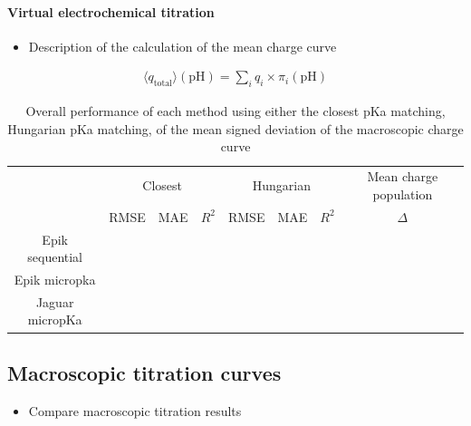 \documentclass[9pt,lineno]{elife}
\newcommand{\pH}{\mathrm{pH}}
\begin{document}
\paragraph{Virtual electrochemical titration}


\begin{itemize}
    \item Description of the calculation of the mean charge curve \\
\end{itemize}

\begin{eqnarray}
      \langle q_\text{total} \rangle (\pH) = \sum_i q_i \times \pi_i(\pH) 
\end{eqnarray}

\begin{table}[H]
\centering
\caption{Overall performance of each method using either the closest pKa matching, Hungarian pKa matching, of the mean signed deviation of the macroscopic charge curve}
\label{tab:overview-performance}
\begin{tabular}{c|ccc|ccc|c}
                & \multicolumn{3}{c|}{Closest} & \multicolumn{3}{c|}{Hungarian} & Mean charge population \\ \cline{2-8} 
          & RMSE     & MAE    & $R^2$    & RMSE     & MAE     & $R^2$     & $\Delta $                     \\ \hline
Epik sequential &          &        &          &          &         &           &                        \\
Epik micropka   &          &        &          &          &         &           &                        \\
Jaguar micropKa &          &        &          &          &         &           &                       
\end{tabular}
\end{table}

\subsection{Macroscopic titration curves}
\begin{itemize}
    \item Compare macroscopic titration results
\end{itemize}
\end{document}
